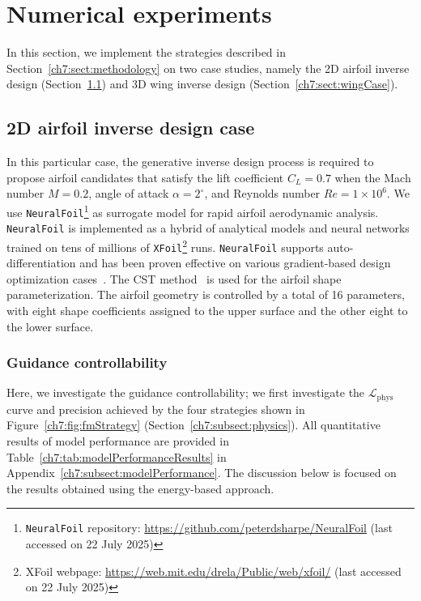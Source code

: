\section{Numerical experiments}
\label{ch7:sect:exp}
In this section, we implement the strategies described in Section~\ref{ch7:sect:methodology} on two case studies, namely the 2D airfoil inverse design (Section~\ref{ch7:sect:AirfoilCase}) and 3D wing inverse design (Section~\ref{ch7:sect:wingCase}).

\subsection{2D airfoil inverse design case}
\label{ch7:sect:AirfoilCase}
In this particular case, the generative inverse design process is required to propose airfoil candidates that satisfy the lift coefficient $C_{L} = 0.7$ when the Mach number $M=0.2$, angle of attack $\alpha=2^\circ$, and Reynolds number $Re = 1\times10^{6}$. We use \texttt{NeuralFoil}\footnote{\texttt{NeuralFoil} repository: \url{https://github.com/peterdsharpe/NeuralFoil} (last accessed on 22 July 2025)} as surrogate model for rapid airfoil aerodynamic analysis. \texttt{NeuralFoil} is implemented as a hybrid of analytical models and neural networks trained on tens of millions of \texttt{XFoil}\footnote{XFoil webpage: \url{https://web.mit.edu/drela/Public/web/xfoil/} (last accessed on 22 July 2025)} runs. \texttt{NeuralFoil} supports auto-differentiation and has been proven effective on various gradient-based design optimization cases~\cite{aa.Sharpe2024}. The CST method~\cite{aa.Kulfan2008} is used for the airfoil shape parameterization. The airfoil geometry is controlled by a total of 16 parameters, with eight shape coefficients assigned to the upper surface and the other eight to the lower surface. 

\subsubsection{Guidance controllability}
\label{ch7:subsect:physicalloss}
Here, we investigate the guidance controllability; we first investigate the $\mathcal{L}_{\mathrm{phys}}$ curve and precision achieved by the four strategies shown in Figure~\ref{ch7:fig:fmStrategy} (Section~\ref{ch7:subsect:physics}). All quantitative results of model performance are provided in Table~\ref{ch7:tab:modelPerformanceResults} in Appendix~\ref{ch7:subsect:modelPerformance}. The discussion below is focused on the results obtained using the energy-based approach.

